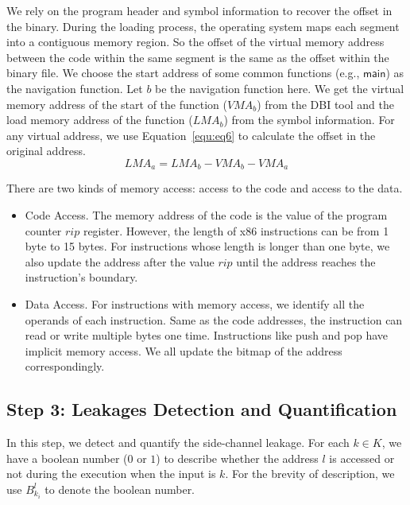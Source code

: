 We rely on the program header and symbol information to recover the
offset in the binary. During the loading process, the operating system
maps each segment into a contiguous memory region. So the offset of
the virtual memory address between the code within the same segment is
the same as the offset within the binary file. We choose the start
address of some common functions (e.g., $\textsf{main}$) as the navigation
function. Let $b$ be the navigation function here. 
We get the virtual memory address of the start of the
function ($\mathit{VMA}_b$) from the DBI tool and the load memory
address of the function ($\mathit{LMA}_b$) from the symbol
information. For any virtual address, we use Equation~\ref{equ:eq6} to
calculate the offset in the original address.
\begin{equation}\label{equ:eq6}
    \mathit{LMA}_a = \mathit{LMA}_b - \mathit{VMA}_b - \mathit{VMA}_a
\end{equation}

There are two kinds of memory access: access to the code and access to the data. 
\begin{itemize}
\item Code Access. The memory address of the code is the value of the program counter $\mathit{rip}$ register. However, the length of x86 instructions can be from 1 byte to 15 bytes. For instructions whose length is longer than one byte, we also update the address after the value $\mathit{rip}$ until the address reaches the instruction's boundary.
\item Data Access. For instructions with memory access, we identify all the operands of each instruction. Same as the code addresses, the instruction can read or write multiple bytes one time.  Instructions like \textsf{push} and \textsf{pop} have implicit memory access. We all update the bitmap of the address correspondingly.
\end{itemize}

\subsection{Step 3: Leakages Detection and Quantification}
In this step, we detect and quantify the side-channel leakage. For each $k \in K$, we have a boolean number ($0$ or $1$) to describe whether the address $l$ is accessed or not during the execution when the input is $k$. For the brevity of description, we use $B^{l}_{k_i}$ to denote the boolean number. 


